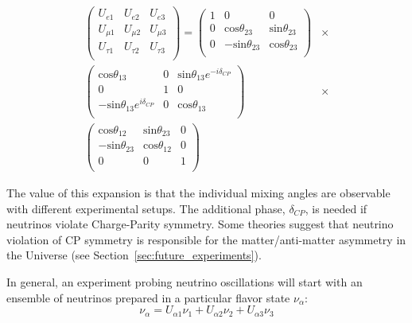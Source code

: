 \begin{align*}
  \left(
  \begin{array}{ccc}
    U_{e1} & U_{e2} & U_{e3}  \\
    U_{\mu1} & U_{\mu2} & U_{\mu3}  \\
    U_{\tau1} & U_{\tau2} & U_{\tau3}  \\
  \end{array} 
  \right)
  = 
  \left(
  \begin{array}{ccc}
    1 & 0 & 0  \\
    0 & \text{cos}\theta_{23} & \text{sin}\theta_{23}  \\
    0 & -\text{sin}\theta_{23} & \text{cos}\theta_{23}  \\
  \end{array} 
  \right)
  &\times \\
  \left(
  \begin{array}{ccc}
     \text{cos}\theta_{13} & 0 & \text{sin}\theta_{13} e^{ - i \delta_{CP}}  \\
     0 & 1 & 0  \\
     -\text{sin}\theta_{13} e^{i \delta_{CP}} & 0 & \text{cos}\theta_{13}  \\
  \end{array} 
  \right)
  &\times \\
  \left(
  \begin{array}{ccc}
    \text{cos}\theta_{12} & \text{sin}\theta_{23} & 0  \\
    - \text{sin}\theta_{23} & \text{cos}\theta_{12} & 0 \\
    0 & 0 & 1  \\
  \end{array} 
  \right)
\end{align*}

The value of this expansion is that the individual mixing angles are observable with different experimental setups.  The additional phase, $\delta_{CP}$, is needed if neutrinos violate Charge-Parity symmetry.  Some theories suggest that neutrino violation of CP symmetry is responsible for the matter/anti-matter asymmetry in the Universe (see Section~\ref{sec:future_experiments}).

In general, an experiment probing neutrino oscillations will start with an ensemble of neutrinos prepared in a particular flavor state $\nu_\alpha$:
\begin{equation*}
\nu_\alpha = U_{\alpha 1} \nu_1 + U_{\alpha 2} \nu_2 + U_{\alpha 3} \nu_3
\end{equation*}


